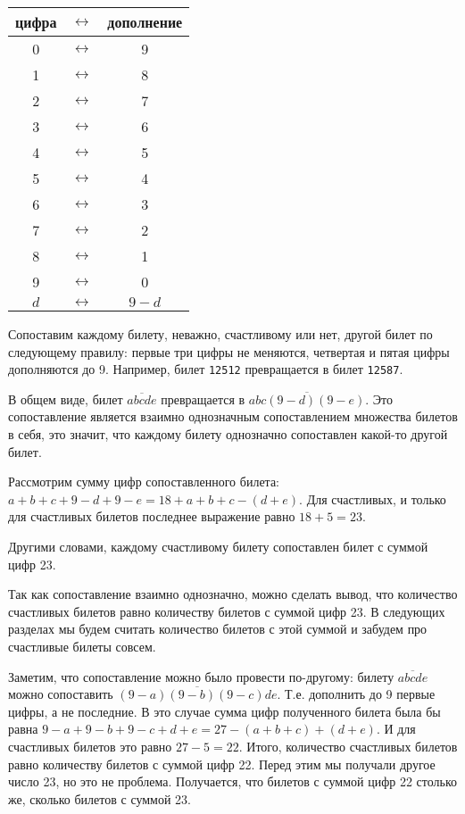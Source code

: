 \documentclass{article}
\begin{document}
\begin{center}
\begin{tabular}{ccc}
	цифра&$\leftrightarrow$&дополнение\\
	\hline
	0&$\leftrightarrow$&9\\
	1&$\leftrightarrow$&8\\
	2&$\leftrightarrow$&7\\
	3&$\leftrightarrow$&6\\
	4&$\leftrightarrow$&5\\
	5&$\leftrightarrow$&4\\
	6&$\leftrightarrow$&3\\
	7&$\leftrightarrow$&2\\
	8&$\leftrightarrow$&1\\
	9&$\leftrightarrow$&0\\
	$d$&$\leftrightarrow$&$9-d$
\end{tabular}
\end{center}

Сопоставим каждому билету, неважно, счастливому или нет, другой билет по следующему правилу: первые три цифры не меняются, четвертая и пятая цифры дополняются до 9. Например, билет \verb|12512| превращается в билет \verb|12587|.

В общем виде, билет $\overline{abcde}$ превращается в
$\overline{abc(9-d)(9-e)}$. Это сопоставление является взаимно однозначным сопоставлением множества билетов в себя, это значит, что каждому билету однозначно сопоставлен какой-то другой билет.

Рассмотрим сумму цифр сопоставленного билета: $a + b + c + 9 - d + 9 - e = 18 + a + b + c - (d + e)$. Для счастливых, и только для счастливых билетов последнее выражение равно $18 + 5 = 23$.

Другими словами, каждому счастливому билету сопоставлен билет с суммой цифр 23.

Так как сопоставление взаимно однозначно, можно сделать вывод, что количество счастливых билетов равно количеству билетов с суммой цифр 23. В следующих разделах мы будем считать количество билетов с этой суммой и забудем про счастливые билеты совсем.

Заметим, что сопоставление можно было провести по-другому:
билету $\overline{abcde}$ можно сопоставить $\overline{(9-a)(9-b)(9-c)de}$. Т.е. дополнить до 9 первые цифры, а не последние. В это случае сумма цифр полученного билета была бы равна
$9-a+9-b+9-c+d+e=27-(a+b+c)+(d+e)$. И для счастливых билетов это равно $27-5=22$. Итого, количество счастливых билетов равно количеству билетов с суммой цифр 22. Перед этим мы получали другое число 23, но это не проблема. Получается, что билетов с суммой цифр 22 столько же, сколько билетов с суммой 23.
\end{document}
